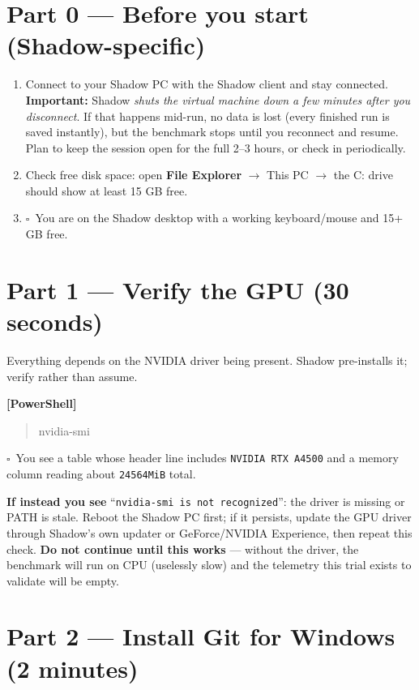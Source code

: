 \documentclass[11pt]{article}
\newenvironment{cmdblock}{\begin{quote}\small\begin{ttfamily}}{\end{ttfamily}\end{quote}}
\newcommand{\checkbox}{$\square$~}
\begin{document}
\section*{Part 0 --- Before you start (Shadow-specific)}

\begin{enumerate}
  \item Connect to your Shadow PC with the Shadow client and stay connected.
    \textbf{Important:} Shadow \emph{shuts the virtual machine down a few minutes after
    you disconnect}. If that happens mid-run, no data is lost (every finished run is
    saved instantly), but the benchmark stops until you reconnect and resume. Plan to
    keep the session open for the full 2--3 hours, or check in periodically.
  \item Check free disk space: open \textbf{File Explorer} $\rightarrow$ This PC
    $\rightarrow$ the C: drive should show at least 15 GB free.
  \item \checkbox You are on the Shadow desktop with a working keyboard/mouse and
    15+ GB free.
\end{enumerate}

\section*{Part 1 --- Verify the GPU (30 seconds)}

Everything depends on the NVIDIA driver being present. Shadow pre-installs it;
verify rather than assume.

\textbf{[PowerShell]}
\begin{cmdblock}
nvidia-smi
\end{cmdblock}

\checkbox You see a table whose header line includes \texttt{NVIDIA RTX A4500}
and a memory column reading about \texttt{24564MiB} total.

\textbf{If instead you see} ``\texttt{nvidia-smi is not recognized}'': the driver is
missing or PATH is stale. Reboot the Shadow PC first; if it persists, update the GPU
driver through Shadow's own updater or GeForce/NVIDIA Experience, then repeat this check.
\textbf{Do not continue until this works} --- without the driver, the benchmark will run
on CPU (uselessly slow) and the telemetry this trial exists to validate will be empty.

\section*{Part 2 --- Install Git for Windows (2 minutes)}
\end{document}
